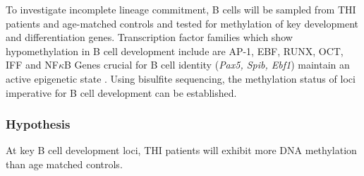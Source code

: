 \documentclass[12pt]{article}
\begin{document}
		To investigate incomplete lineage commitment, B cells will be sampled from THI patients and age-matched controls and tested for methylation of key development and differentiation genes. 
		Transcription factor families which show hypomethylation in B cell development include are AP-1, EBF, RUNX, OCT, IFF and NF$\kappa$B
		Genes crucial for B cell identity (\textit{Pax5, Spib, Ebf1}) maintain an active epigenetic state \citep{Li13,Choukrallah14}. 
		Using bisulfite sequencing, the methylation status of loci imperative for B cell development can be established. 
		
		\subsubsection{Hypothesis}
			
			At key B cell development loci, THI patients will exhibit more DNA methylation than age matched controls.


	
	
	\newpage
	
	
	
\end{document}
